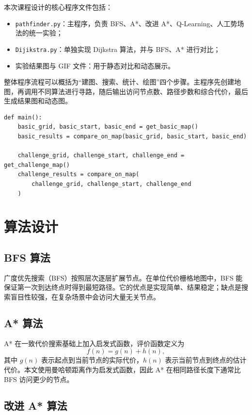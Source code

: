\documentclass[12pt,a4paper,fontset=none]{ctexart}
\begin{document}
本次课程设计的核心程序文件包括：
\begin{itemize}[nosep]
  \item \texttt{pathfinder.py}：主程序，负责 BFS、A*、改进 A*、Q-Learning、人工势场法的统一实验；
  \item \texttt{Dijikstra.py}：单独实现 Dijkstra 算法，并与 BFS、A* 进行对比；
  \item 实验结果图与 GIF 文件：用于静态对比和动态展示。
\end{itemize}

整体程序流程可以概括为“建图、搜索、统计、绘图”四个步骤。主程序先创建地图，再调用不同算法进行寻路，随后输出访问节点数、路径步数和综合代价，最后生成结果图和动态图。

\begin{lstlisting}[caption={主程序的整体流程}]
def main():
    basic_grid, basic_start, basic_end = get_basic_map()
    basic_results = compare_on_map(basic_grid, basic_start, basic_end)

    challenge_grid, challenge_start, challenge_end = get_challenge_map()
    challenge_results = compare_on_map(
        challenge_grid, challenge_start, challenge_end
    )
\end{lstlisting}

\section{算法设计}

\subsection{BFS 算法}

广度优先搜索（BFS）按照层次逐层扩展节点。在单位代价栅格地图中，BFS 能保证第一次到达终点时得到最短路径。它的优点是实现简单、结果稳定；缺点是搜索盲目性较强，在复杂场景中会访问大量无关节点。

\subsection{A* 算法}

A* 在一致代价搜索基础上加入启发式函数，评价函数定义为
\begin{equation}
f(n)=g(n)+h(n),
\end{equation}
其中 $g(n)$ 表示起点到当前节点的实际代价，$h(n)$ 表示当前节点到终点的估计代价。本文使用曼哈顿距离作为启发式函数，因此 A* 在相同路径长度下通常比 BFS 访问更少的节点。

\subsection{改进 A* 算法}
\end{document}
